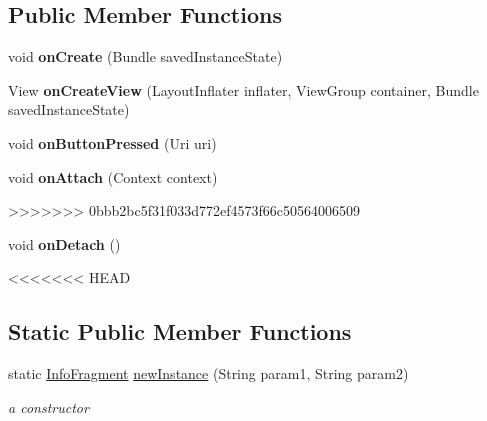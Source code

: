 \begin{DoxyCompactItemize}
\subsection*{\-Public \-Member \-Functions}
\begin{DoxyCompactItemize}
\item 
\hypertarget{classcom_1_1example_1_1sel_1_1lostfound_1_1InfoFragment_a1a9382b4b0ceacfc464559a897fa7656}{void {\bfseries on\-Create} (\-Bundle saved\-Instance\-State)}\label{classcom_1_1example_1_1sel_1_1lostfound_1_1InfoFragment_a1a9382b4b0ceacfc464559a897fa7656}

\item 
\hypertarget{classcom_1_1example_1_1sel_1_1lostfound_1_1InfoFragment_adb5e6a68883e5b4cb236e0e2e221d7f4}{\-View {\bfseries on\-Create\-View} (\-Layout\-Inflater inflater, \-View\-Group container, \-Bundle saved\-Instance\-State)}\label{classcom_1_1example_1_1sel_1_1lostfound_1_1InfoFragment_adb5e6a68883e5b4cb236e0e2e221d7f4}

\item 
\hypertarget{classcom_1_1example_1_1sel_1_1lostfound_1_1InfoFragment_a20ae678d3072262f318a083241372871}{void {\bfseries on\-Button\-Pressed} (\-Uri uri)}\label{classcom_1_1example_1_1sel_1_1lostfound_1_1InfoFragment_a20ae678d3072262f318a083241372871}

\item 
\hypertarget{classcom_1_1example_1_1sel_1_1lostfound_1_1InfoFragment_a07cb9a9ac26dec9f20abce73c04f92e1}{void {\bfseries on\-Attach} (\-Context context)}\label{classcom_1_1example_1_1sel_1_1lostfound_1_1InfoFragment_a07cb9a9ac26dec9f20abce73c04f92e1}
>>>>>>> 0bbb2bc5f31f033d772ef4573f66c50564006509

\item 
\hypertarget{classcom_1_1example_1_1sel_1_1lostfound_1_1InfoFragment_a1fff5a01de59e68f81999e2c558325ba}{void {\bfseries on\-Detach} ()}\label{classcom_1_1example_1_1sel_1_1lostfound_1_1InfoFragment_a1fff5a01de59e68f81999e2c558325ba}

\end{DoxyCompactItemize}
<<<<<<< HEAD
\subsection*{Static Public Member Functions}
\begin{DoxyCompactItemize}
\item 
static \hyperlink{classcom_1_1example_1_1sel_1_1lostfound_1_1InfoFragment}{Info\-Fragment} \hyperlink{classcom_1_1example_1_1sel_1_1lostfound_1_1InfoFragment_adb1e26f4f2a3a0f918bff5c5df58e695}{new\-Instance} (String param1, String param2)
\begin{DoxyCompactList}\small\item\em a constructor \end{DoxyCompactList}\end{DoxyCompactItemize}



\end{DoxyCompactItemize}

